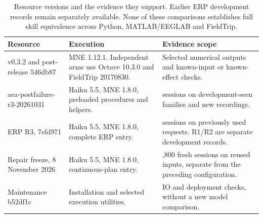 \begin{table}[!htbp]
\centering\small
\caption{Resource versions and the evidence they support. Earlier ERP development records remain separately available. None of these comparisons establishes full skill equivalence across Python, MATLAB/EEGLAB and FieldTrip.}
\label{tab:version-routes}
\begin{tabular}{>{\raggedright\arraybackslash}p{4.0cm}>{\raggedright\arraybackslash}p{4.4cm}>{\raggedright\arraybackslash}p{6.1cm}}
\toprule
Resource & Execution & Evidence scope\\
\midrule
v0.3.2 and post-release 546db87 & MNE 1.12.1. Independent arms use Octave 10.3.0 and FieldTrip 20170830. & Selected numerical outputs and known-input or known-effect checks.\\
aea-postfailure-r3-20261031 & Haiku 5.5, MNE 1.8.0, preloaded procedures and helpers. & 600 sessions on development-seen families and new recordings.\\
ERP R3, 7efd971 & Haiku 5.5, MNE 1.8.0, complete ERP entry. & 144 sessions on previously used requests. R1/R2 are separate development records.\\
Repair freeze, 8 November 2026 & Haiku 5.5, MNE 1.8.0, continuous-plan entry. & 1,800 fresh sessions on reused inputs, separate from the preceding configuration.\\
Maintenance b52df1c & Installation and selected execution utilities. & IO and deployment checks, without a new model comparison.\\
\bottomrule
\end{tabular}
\end{table}
